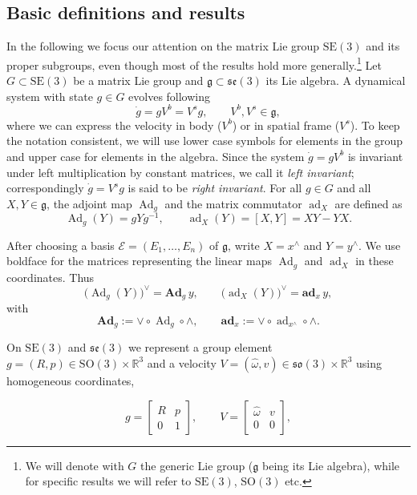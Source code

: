 \documentclass[11pt]{article}
\newenvironment{revision}{\color{red}}{}
\newcommand{\bAd}{\mathbf{Ad}}
\newcommand{\bad}{\mathbf{ad}}
\newcommand{\SO}{\mathrm{SO}}
\newcommand{\SE}{\mathrm{SE}}
\newcommand{\so}{\mathfrak{so}}
\newcommand{\se}{\mathfrak{se}}
\newcommand{\gfrak}{\mathfrak g}
\newcommand{\Ad}{\operatorname{Ad}}
\newcommand{\ad}{\operatorname{ad}}
\newcommand{\R}{\mathbb R}
\begin{document}
\subsection{Basic definitions and results}\label{subsec:basic-definitions}
In the following we focus our attention on the matrix Lie group $\SE(3)$ and its proper subgroups, even though most of the results hold more generally.\footnote{We will denote with $G$ the generic Lie group ($\gfrak$ being its Lie algebra), while for specific results we will refer to $\SE(3)$, $\SO(3)$ etc.} Let $G\subset\SE(3)$ be a matrix Lie group and $\gfrak\subset\se(3)$ its Lie algebra. A dynamical system with state $g\in G$ evolves following
\begin{equation*}
\dot g=gV^b=V^s g,\qquad V^b,V^s\in\gfrak,\tag{2.1}\label{eq:2.1}
\end{equation*}
where we can express the velocity in body ($V^b$) or in spatial frame ($V^s$). To keep the notation consistent, we will use lower case symbols for elements in the group and upper case for elements in the algebra. Since the system $\dot g=gV^b$ is invariant under left multiplication by constant matrices, we call it \emph{left invariant}; correspondingly $\dot g=V^s g$ is said to be \emph{right invariant}. For all $g\in G$ and all $X,Y\in\gfrak$, the adjoint map $\Ad_g$ and the matrix commutator $\ad_X$ are defined as
\begin{equation*}
\Ad_g(Y)=gYg^{-1},\qquad \ad_X(Y)=[X,Y]=XY-YX.
\end{equation*}

\begin{revision}
After choosing a basis $\mathcal E=(E_1,\ldots,E_n)$ of $\gfrak$, write $X=x^\wedge$ and $Y=y^\wedge$. We use boldface for the matrices representing the linear maps $\Ad_g$ and $\ad_X$ in these coordinates. Thus
\[
\bigl(\Ad_g(Y)\bigr)^\vee=\bAd_g\,y,
\qquad
\bigl(\ad_X(Y)\bigr)^\vee=\bad_x\,y,
\]
with
\[
\boxed{
\bAd_g:=\vee\circ\Ad_g\circ\wedge,
\qquad
\bad_x:=\vee\circ\ad_{x^\wedge}\circ\wedge.
}
\]
\end{revision}

On $\SE(3)$ and $\se(3)$ we represent a group element $g=(R,p)\in\SO(3)\times\R^3$ and a velocity $V=(\widehat\omega,v)\in\so(3)\times\R^3$ using homogeneous coordinates,

\begin{equation*}
g=\begin{bmatrix}R&p\\0&1\end{bmatrix},\qquad
V=\begin{bmatrix}\widehat\omega&v\\0&0\end{bmatrix},
\end{equation*}
\end{document}
